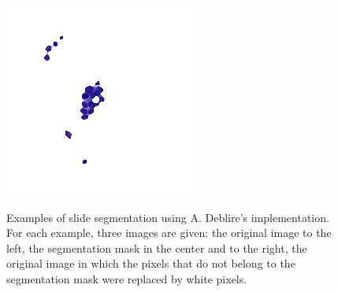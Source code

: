 \begin{figure}
{		\includegraphics[scale=0.5]{image/slide_segmentation_2_masked.png}
	} \\
	\caption{Examples of slide segmentation using A. Deblire's implementation. For each example, three images are given: the original image to the left, the segmentation mask in the center and to the right, the original image in which the pixels that do not belong to the segmentation mask were replaced by white pixels.}
	\label{fig:first_seg_examples}
\end{figure}

